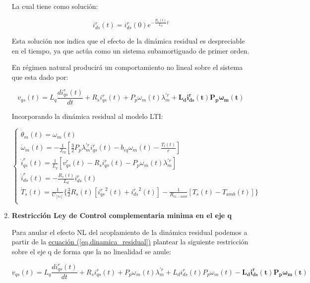 \documentclass{article}
\begin{document}
\begin{enumerate}[label=\roman*.]
    La cual tiene como solución:

    \begin{equation}
        i_{ds}^r(t) = i_{ds}^r(0)e^{-\frac{R_{s}(t)}{L_{d}}t}
    \end{equation}

    Esta solución nos indica que el efecto de la dinámica residual es despreciable en el tiempo, ya que actúa como
    un sistema subamortiguado de primer orden.

    En régimen natural producirá un comportamiento no lineal sobre el sistema que esta dado por:

    \begin{equation}\label{eq.dinamica_residual}
        v_{qs}(t) = L_{q}\frac{di_{qs}^r(t)}{dt} + R_{s}i_{qs}^r(t) + P_{p}\omega_{m}(t)\lambda_{m}^{\prime r} + \mathbf{L_{d}i_{ds}^r(t)P_{p}\omega_{m}(t)}
    \end{equation}

    Incorporando la dinámica residual al modelo LTI:    

    \begin{equation}
        \begin{cases}
            \dot{\theta}_{m}(t) = \omega_{m}(t)\\
            \dot{\omega}_{m}(t) = -\frac{1}{J_{eq}}[\frac{3}{2}P_{p}\lambda_{m}^{\prime r} i_{qs}^r(t) - b_{eq}\omega_{m}(t)-\frac{T_{l}(t)}{r}]\\
            \dot{i}_{qs}^r(t) = \frac{1}{L_{q}}[v_{qs}^r(t) - R_{s}i_{qs}^r(t) - P_{p}\omega_{m}(t)\lambda_{m}^{\prime r}]\\
            \dot{i}_{ds}^r(t) = -\frac{R_{s}(t)}{L_{d}}i_{ds}^r(t) \\
            \dot{T}_{s}(t) = \frac{1}{C_[ts]}\{\frac{3}{2}R_{s}(t)[{i_{qs}^r}^2(t) + {i_{ds}^r}^2(t)] - \frac{1}{R_{ts-amb}}[T_{s}(t) - T_{amb}(t)]\}\\
        \end{cases}    
    \end{equation}

    \item \textbf{Restricción Ley de Control complementaria minima en el eje q}
    
    Para anular el efecto NL del acoplamiento de la dinámica residual podemos a partir de la
    \hyperref[eq.dinamica_residual]{ecuación (\ref*{eq.dinamica_residual})}
    plantear la siguiente restricción sobre el eje q de forma que la no linealidad se anule:

    \begin{equation}
        v_{qs}(t) = L_{q}\frac{di_{qs}^r(t)}{dt} + R_{s}i_{qs}^r(t) + P_{p}\omega_{m}(t)\lambda_{m}^{\prime r} + L_{d}i_{ds}^r(t)P_{p}\omega_{m}(t) - \mathbf{L_{d}i_{ds}^r(t)P_{p}\omega_{m}(t)}
    \end{equation}


\end{enumerate}
\end{document}
